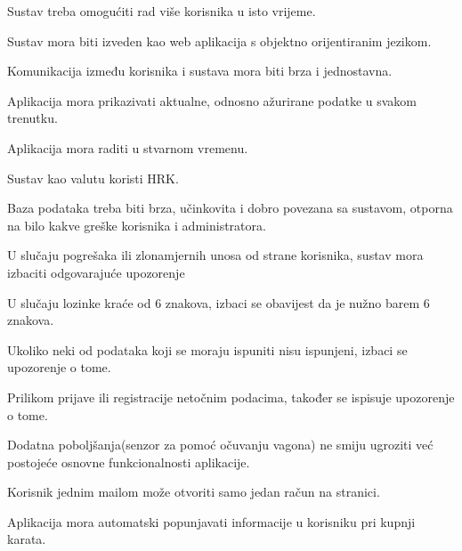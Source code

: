 			\begin{packed_item}
				\item {Sustav treba omogućiti rad više korisnika u isto vrijeme.}
				\item {Sustav mora biti izveden kao web aplikacija s objektno orijentiranim jezikom.}
				\item {Komunikacija između korisnika i sustava mora biti brza i jednostavna.}
				\item {Aplikacija mora prikazivati aktualne, odnosno ažurirane podatke u svakom trenutku.}
				\item {Aplikacija mora raditi u stvarnom vremenu.}
				\item {Sustav kao valutu koristi HRK.}
				\item{Baza podataka treba biti brza, učinkovita i dobro povezana sa sustavom, otporna na bilo kakve greške korisnika i administratora.}
				\item {U slučaju pogrešaka ili zlonamjernih unosa od strane korisnika, sustav mora izbaciti odgovarajuće upozorenje}
					\begin{packed_item}
					\item {U slučaju lozinke kraće od 6 znakova, izbaci se obavijest da je nužno barem 6 znakova.}
					\item {Ukoliko neki od podataka koji se moraju ispuniti nisu ispunjeni, izbaci se upozorenje o tome.}
					\item {Prilikom prijave ili registracije netočnim podacima, također se ispisuje upozorenje o tome.}
					\end{packed_item}
				\item {Dodatna poboljšanja(senzor za pomoć očuvanju vagona) ne smiju ugroziti već postojeće osnovne funkcionalnosti aplikacije.}
				\item {Korisnik jednim mailom može otvoriti samo jedan račun na stranici.}
				\item {Aplikacija mora automatski popunjavati informacije u korisniku pri kupnji karata.}
			\end{packed_item}
		 
			 
			 
			 
	